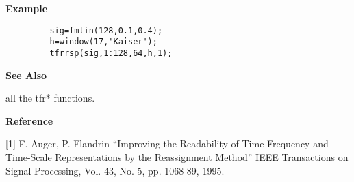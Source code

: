 
{\bf \large \sf Example}
\begin{verbatim}
         sig=fmlin(128,0.1,0.4); 
         h=window(17,'Kaiser'); 
         tfrrsp(sig,1:128,64,h,1);
\end{verbatim}
\vspace*{.5cm}

{\bf \large \sf See Also}\\
\hspace*{1.5cm}
\begin{minipage}[t]{13.5cm}
all the {\ty tfr*} functions.
\end{minipage}
\vspace*{.5cm}


{\bf \large \sf Reference}\\
\hspace*{1.5cm}
\begin{minipage}[t]{13.5cm}
[1] F. Auger, P. Flandrin ``Improving the Readability of Time-Frequency and
Time-Scale Representations by the Reassignment Method'' IEEE Transactions
on Signal Processing, Vol. 43, No. 5, pp. 1068-89, 1995.
\end{minipage}

